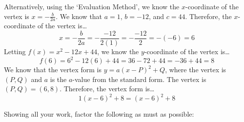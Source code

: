\documentclass[12pt,letterpaper]{exam}
\begin{document}
\begin{questions}
{Alternatively, using the `Evaluation Method', we know the $x$-coordinate of the vertex is $x= -\frac{b}{2a}$. We know that $a= 1$, $b= -12$, and $c= 44$. Therefore, the $x$-coordinate of the vertex is\dots
	\[
	x= -\dfrac{b}{2a}= -\dfrac{-12}{2(1)}= -\dfrac{-12}{2}= -(-6)= 6
	\] \pspace
Letting $f(x)= x^2 - 12x + 44$, we know the $y$-coordinate of the vertex is\dots
	\[
	f(6)= 6^2 - 12(6) + 44= 36 - 72 + 44= -36 + 44= 8
	\] \pspace
We know that the vertex form is $y= a(x - P)^2 + Q$, where the vertex is $(P, Q)$ and $a$ is the $a$-value from the standard form. The vertex is $(P, Q)= (6, 8)$. Therefore, the vertex form is\dots
	\[
	1(x - 6)^2 + 8= \boxed{(x - 6)^2 + 8}
	\]
}



\newpage
\question[8] Showing all your work, factor the following as must as possible: \par\vspace{0.3cm}
\end{questions}
\end{document}

